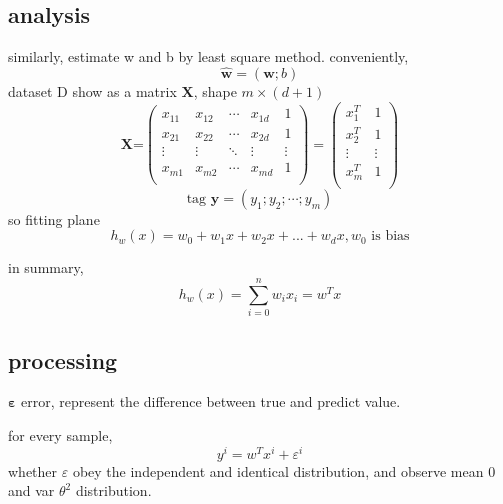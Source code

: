 \documentclass[12pt]{ctexart}%
\begin{document}
	\subsection{\quad analysis}
	similarly, estimate w and b by least square method. 
	conveniently, 
	\begin{equation}\hat{\boldsymbol{w}} = (\boldsymbol{w}; b)\end{equation}
	dataset D show as a matrix $\boldsymbol{X}$, shape $m\times (d+1)$
	\begin{equation}
	\boldsymbol{X}\text{=}
	\left( 
	\begin{matrix}
	{{x}_{11}} & {{x}_{12}} & \cdots  & {{x}_{1d}} & 1  \\
	{{x}_{21}} & {{x}_{22}} & \cdots  & {{x}_{2d}} & 1  \\
	\vdots  & \vdots  & \ddots  & \vdots  & \vdots   \\
	{{x}_{m1}} & {{x}_{m2}} & \cdots  & {{x}_{md}} & 1  \\
	\end{matrix} 
	\right)
	=
	\left( 
	\begin{matrix}
	x_{1}^{T} & 1  \\
	x_{2}^{T} & 1  \\
	\vdots  & \vdots   \\
	x_{m}^{T} & 1  \\
	\end{matrix} 
	\right)
	\end{equation}
	\begin{equation}\text{tag }\boldsymbol{y} = (y_1; y_2; \cdots; y_m)\end{equation}
	so fitting plane \begin{equation}h_w(x) = w_0+w_1x+w_2x+...+w_dx, w_0 
	\text{ is bias}\end{equation}
	
	in summary, \begin{equation}h_w(x) = \sum_{i=0}^{n}w_{i}x_{i} = w^{T}x\end{equation}
	
	\subsection{\quad processing}
	$\boldsymbol \varepsilon$ error, represent the difference between true and predict value.
	
	for every sample, \begin{equation}y^i = w^Tx^i + \varepsilon^i\end{equation}
	\qquad whether $\varepsilon$ obey the independent and identical distribution, and observe mean 0 and var $\theta^2$ distribution.
	
\end{document}
